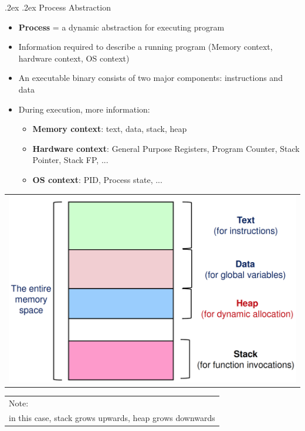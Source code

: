\documentclass[10pt,landscape,a4paper]{article}
\makeatletter
\renewcommand{\subsection}{\@startsection{subsection}{1}{0mm}%
  {.2ex}%
  {.2ex}%
{\sffamily\bfseries}}
\makeatother
\begin{document}
\begin{multicols*}{4}
  \subsection{Process Abstraction}
  \begin{itemize}
    \item \textbf{Process} = a dynamic abstraction for executing program
    \item Information required to describe a running program (Memory context, hardware context, OS context)
    \item An executable binary consists of two major components: instructions and data
    \item During execution, more information:
          \begin{itemize}
            \item \textbf{Memory context}: text, data, stack, heap
            \item \textbf{Hardware context}: General Purpose Registers, Program Counter, Stack Pointer, Stack FP, ...
            \item \textbf{OS context}: PID, Process state, ...
          \end{itemize}
  \end{itemize}
  \begin{tabularx}{0.72\columnwidth}{X}
    \includegraphics[width=\linewidth]{stack-memory}
  \end{tabularx}
  \begin{tabularx}{0.25\columnwidth}{X}
    Note: \\ in this case, stack grows upwards, heap grows downwards
  \end{tabularx}


\end{multicols*}
\end{document}

